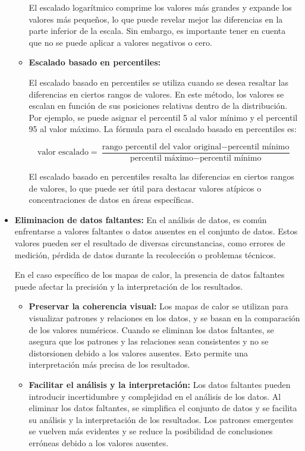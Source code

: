 \documentclass{article}
\begin{document}
\begin{itemize}
\begin{itemize}
El escalado logarítmico comprime los valores más grandes y expande los valores más pequeños, lo que puede revelar mejor las diferencias en la parte inferior de la escala. Sin embargo, es importante tener en cuenta que no se puede aplicar a valores negativos o cero.

\item   \textbf{Escalado basado en percentiles:}

El escalado basado en percentiles se utiliza cuando se desea resaltar las diferencias en ciertos rangos de valores. En este método, los valores se escalan en función de sus posiciones relativas dentro de la distribución. Por ejemplo, se puede asignar el percentil 5 al valor mínimo y el percentil 95 al valor máximo. La fórmula para el escalado basado en percentiles es:

\begin{equation}
    \textrm{valor escalado} = \frac{\textrm{rango percentil del valor original} - \textrm{percentil mínimo}}{\textrm{percentil máximo} - \textrm{percentil mínimo}}
\end{equation}

El escalado basado en percentiles resalta las diferencias en ciertos rangos de valores, lo que puede ser útil para destacar valores atípicos o concentraciones de datos en áreas específicas.
\end{itemize}


\item \textbf{Eliminacion de datos faltantes: }
En el análisis de datos, es común enfrentarse a valores faltantes o datos ausentes en el conjunto de datos. Estos valores pueden ser el resultado de diversas circunstancias, como errores de medición, pérdida de datos durante la recolección o problemas técnicos.

En el caso específico de los mapas de calor, la presencia de datos faltantes puede afectar la precisión y la interpretación de los resultados. 

\begin{itemize}
\item   \textbf{Preservar la coherencia visual: }Los mapas de calor se utilizan para visualizar patrones y relaciones en los datos, y se basan en la comparación de los valores numéricos. Cuando se eliminan los datos faltantes, se asegura que los patrones y las relaciones sean consistentes y no se distorsionen debido a los valores ausentes. Esto permite una interpretación más precisa de los resultados.

\item   \textbf{Facilitar el análisis y la interpretación: }Los datos faltantes pueden introducir incertidumbre y complejidad en el análisis de los datos. Al eliminar los datos faltantes, se simplifica el conjunto de datos y se facilita su análisis y la interpretación de los resultados. Los patrones emergentes se vuelven más evidentes y se reduce la posibilidad de conclusiones erróneas debido a los valores ausentes.


\end{itemize}
\end{itemize}
\end{document}
